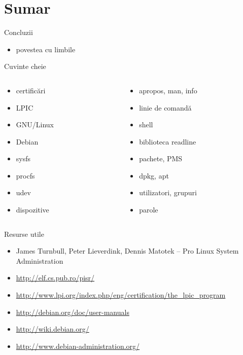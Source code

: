 \documentclass{training}
\begin{document}
\section{Sumar}

\begin{frame}{Concluzii}
  \begin{itemize}
    \item povestea cu limbile
  \end{itemize}
\end{frame}

\begin{frame}{Cuvinte cheie}
  \begin{columns}
    \begin{column}{0.5\textwidth}
      \begin{itemize}
        \item certificări
        \item LPIC
        \item GNU/Linux
        \item Debian
        \item sysfs
        \item procfs
        \item udev
        \item dispozitive
      \end{itemize}
    \end{column}
    \begin{column}{0.5\textwidth}
      \begin{itemize}
        \item apropos, man, info
        \item linie de comandă
        \item shell
        \item biblioteca readline
        \item pachete, PMS
        \item dpkg, apt
        \item utilizatori, grupuri
        \item parole
      \end{itemize}
    \end{column}
  \end{columns}
\end{frame}

\begin{frame}{Resurse utile}
  \begin{itemize}
    \item James Turnbull, Peter Lieverdink, Dennis Matotek -- Pro Linux System Administration
    \item \url{http://elf.cs.pub.ro/pisr/}
    \item \url{http://www.lpi.org/index.php/eng/certification/the_lpic_program}
    \item \url{http://debian.org/doc/user-manuals}
    \item \url{http://wiki.debian.org/}
    \item \url{http://www.debian-administration.org/}
  \end{itemize}
\end{frame}
\end{document}
